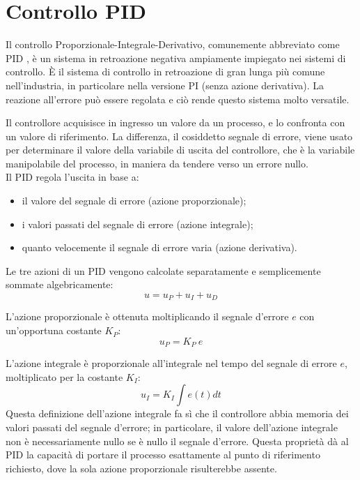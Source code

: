 \documentclass[laurea,oneside,11pt]{USiena_tesiLM}
\begin{document}
\section{Controllo PID}
Il controllo Proporzionale-Integrale-Derivativo, comunemente abbreviato come PID \cite{testolin2013controllori}, è un sistema in retroazione negativa ampiamente impiegato nei sistemi di controllo. È il sistema di controllo in retroazione di gran lunga più comune nell'industria, in particolare nella versione PI (senza azione derivativa). 
La reazione all'errore può essere regolata e ciò rende questo sistema molto versatile.

Il controllore acquisisce in ingresso un valore da un processo, e lo confronta con un valore di riferimento. La differenza, il cosiddetto segnale di errore, viene  usato per determinare il valore della variabile di uscita del controllore, che è la variabile manipolabile del processo, in maniera da tendere verso un errore nullo.\\

Il PID regola l'uscita in base a:
\begin{itemize}
\item il valore del segnale di errore (azione proporzionale);
\item i valori passati del segnale di errore (azione integrale);
\item quanto velocemente il segnale di errore varia (azione derivativa).
\end{itemize}

Le tre azioni di un PID vengono calcolate separatamente e semplicemente sommate algebricamente:
\begin{equation}
u=u_P + u_I + u_D 
\end{equation}

L'azione proporzionale è ottenuta moltiplicando il segnale d'errore $e$ con un'opportuna costante $K_P$:
\begin{equation}
u_P = K_P \ e
\end{equation}

L'azione integrale è proporzionale all'integrale nel tempo del segnale di errore $e$, moltiplicato per la costante $K_I$:
\begin{equation}
u_I = K_I \int e(t) dt
\end{equation}
Questa definizione dell'azione integrale fa sì che il controllore abbia memoria dei valori passati del segnale d'errore; in particolare, il valore dell'azione integrale non è necessariamente nullo se è nullo il segnale d'errore. Questa proprietà dà al PID la capacità di portare il processo esattamente al punto di riferimento richiesto, dove la sola azione proporzionale risulterebbe assente.
\end{document}
